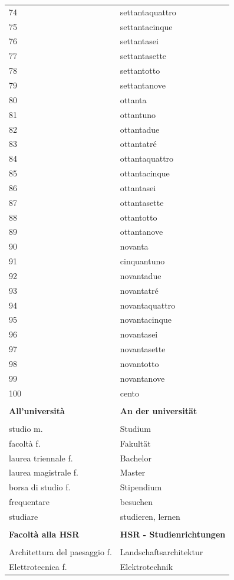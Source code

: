 \documentclass[10pt]{scrartcl}
\begin{document}
\begin{multicols*}{2}
\begin{supertabular}{p{4cm}p{4cm}}
74 & settantaquattro\\
75 & settantacinque\\
76 & settantasei\\
77 & settantasette\\
78 & settantotto\\
79 & settantanove\\
80 & ottanta\\
81 & ottantuno\\
82 & ottantadue\\
83 & ottantatré\\
84 & ottantaquattro\\
85 & ottantacinque\\
86 & ottantasei\\
87 & ottantasette\\
88 & ottantotto\\
89 & ottantanove\\
90 & novanta\\
91 & cinquantuno\\
92 & novantadue\\
93 & novantatré\\
94 & novantaquattro\\
95 & novantacinque\\
96 & novantasei\\
97 & novantasette\\
98 & novantotto\\
99 & novantanove\\
100 & cento\\
\\
\textbf{All'università} & \textbf{An der universität} \\
\\
studio \hfill m. & Studium\\
facoltà \hfill f. & Fakultät\\
laurea triennale \hfill f. & Bachelor\\
laurea magistrale \hfill f. & Master\\
borsa di studio \hfill f. & Stipendium\\
frequentare & besuchen\\
studiare & studieren, lernen\\
\\
\textbf{Facoltà alla HSR} & \textbf{HSR - Studienrichtungen} \\
\\
Architettura del paesaggio \hfill f. & Landschaftsarchitektur\\
Elettrotecnica \hfill f. & Elektrotechnik\\

\end{supertabular}
\end{multicols*}
\end{document}
